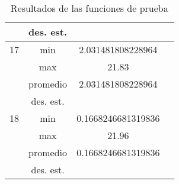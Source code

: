 \documentclass{report}
\begin{document}
\begin{table}[ht]
\begin{tabular}{|c|c|c|c|}
                              & des. est.                   &            &        \\ \hline
        17                    & min                         &      2.031481808228964      &        \\ \cline{2-4} 
                              & max                         &       21.83     &        \\ \cline{2-4} 
                              & promedio                    &        2.031481808228964    &        \\ \cline{2-4} 
                              & des. est.                   &            &        \\ \hline
        18                    & min                         &     0.1668246681319836       &        \\ \cline{2-4} 
                              & max                         &      21.96      &        \\ \cline{2-4} 
                              & promedio                    &      0.1668246681319836      &        \\ \cline{2-4} 
                              & des. est.                   &            &        \\ \hline

        \end{tabular}
        \caption{Resultados de las funciones de prueba}
        \label{tab:resultados}
    \end{table}
        

        
\end{document}

